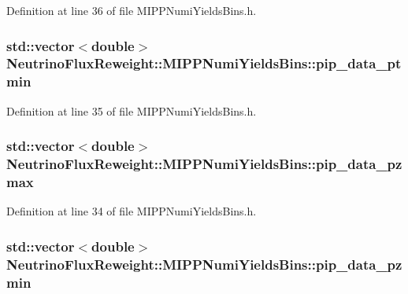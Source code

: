 Definition at line 36 of file M\-I\-P\-P\-Numi\-Yields\-Bins.\-h.

\hypertarget{class_neutrino_flux_reweight_1_1_m_i_p_p_numi_yields_bins_aec5bdb4bcc7c894e34db336163e0bc13}{
\subsubsection[{pip\-\_\-data\-\_\-ptmin}]{\setlength{\rightskip}{0pt plus 5cm}std\-::vector$<$double$>$ Neutrino\-Flux\-Reweight\-::\-M\-I\-P\-P\-Numi\-Yields\-Bins\-::pip\-\_\-data\-\_\-ptmin}}\label{class_neutrino_flux_reweight_1_1_m_i_p_p_numi_yields_bins_aec5bdb4bcc7c894e34db336163e0bc13}


Definition at line 35 of file M\-I\-P\-P\-Numi\-Yields\-Bins.\-h.

\hypertarget{class_neutrino_flux_reweight_1_1_m_i_p_p_numi_yields_bins_a245698dccfcff92bc4d1bf3458e2d809}{
\subsubsection[{pip\-\_\-data\-\_\-pzmax}]{\setlength{\rightskip}{0pt plus 5cm}std\-::vector$<$double$>$ Neutrino\-Flux\-Reweight\-::\-M\-I\-P\-P\-Numi\-Yields\-Bins\-::pip\-\_\-data\-\_\-pzmax}}\label{class_neutrino_flux_reweight_1_1_m_i_p_p_numi_yields_bins_a245698dccfcff92bc4d1bf3458e2d809}


Definition at line 34 of file M\-I\-P\-P\-Numi\-Yields\-Bins.\-h.

\hypertarget{class_neutrino_flux_reweight_1_1_m_i_p_p_numi_yields_bins_aa9625cf6520d1906b084fc7051e28e64}{
\subsubsection[{pip\-\_\-data\-\_\-pzmin}]{\setlength{\rightskip}{0pt plus 5cm}std\-::vector$<$double$>$ Neutrino\-Flux\-Reweight\-::\-M\-I\-P\-P\-Numi\-Yields\-Bins\-::pip\-\_\-data\-\_\-pzmin}}\label{class_neutrino_flux_reweight_1_1_m_i_p_p_numi_yields_bins_aa9625cf6520d1906b084fc7051e28e64}


